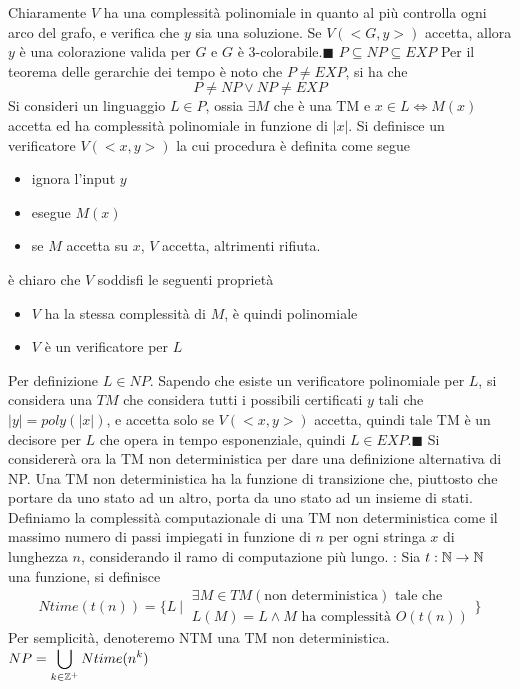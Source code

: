 \documentclass[10pt, letterpaper]{report}
\begin{document}
Chiaramente $V$ ha una complessità polinomiale in quanto al più controlla ogni arco del grafo, e verifica che $y$ sia una soluzione. Se $V(<G,y>)$ accetta, allora $y$ è una colorazione valida per $G$ e $G$ è 3-colorabile.\hfill$\blacksquare$\acc  
\teo{} $P\subseteq NP \subseteq EXP$
\acc\dimo{}
Per il teorema delle gerarchie dei tempo è noto che $P\ne EXP$, si ha che 
$$ P\ne NP \lor NP \ne EXP$$
Si consideri un linguaggio $L\in P$, ossia $\exists M$ che è una TM e $x\in L \iff M(x)$ accetta ed ha complessità polinomiale in funzione di $|x|$. Si definisce un verificatore $V(<x,y>)$ la cui procedura è definita come segue\begin{itemize}
    \item ignora l'input $y$
    \item esegue $M(x)$
    \item se $M$ accetta su $x$, $V$ accetta, altrimenti rifiuta.
\end{itemize}
è chiaro che $V$ soddisfi le seguenti proprietà 
\begin{itemize}
    \item $V$ ha la stessa complessità di $M$, è quindi polinomiale 
    \item $V$ è un verificatore per $L$
\end{itemize}
Per definizione $L\in NP$. Sapendo che esiste un verificatore polinomiale per $L$, si considera una $TM$ che considera tutti i possibili certificati $y$ tali che $|y|=poly(|x|)$, e accetta solo se $V(<x,y>)$ accetta, quindi tale TM è un decisore per $L$ che opera in tempo esponenziale, quindi $L\in EXP$.\hfill$\blacksquare$\acc  
Si considererà ora la TM non deterministica per dare una definizione alternativa di NP. Una TM non deterministica ha la funzione di transizione che, piuttosto che portare da uno stato ad un altro, porta da uno stato ad un insieme di stati. \acc 
Definiamo la complessità computazionale di una TM non deterministica come il massimo numero di passi impiegati in funzione di $n$ per ogni stringa $x$ di lunghezza $n$, considerando il ramo di computazione più lungo.\acc 
{} : Sia $t:{\mathbb N}\rightarrow {\mathbb N}$ una funzione, si definisce 
$$ Ntime(t(n))=\Bigg\{L \ |\ \begin{matrix}\exists M \in TM(\text{non deterministica}) \text{ tale che }\\ L(M)=L\land M\text{ ha complessità }O(t(n))\end{matrix}\Bigg\}$$
Per semplicità, denoteremo NTM una TM non deterministica.\acc 
{} $\displaystyle NP=\bigcup_{k\in{\mathbb Z}^+}Ntime(n^k)$
\acc 
\end{document}
